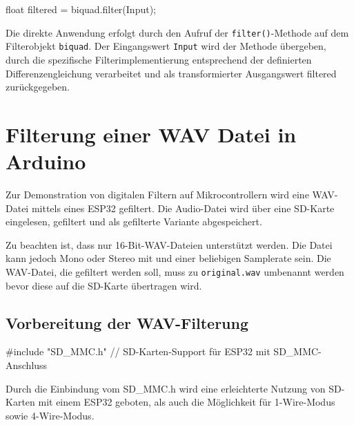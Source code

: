 \documentclass[
  ngerman,
  letterpaper,
  DIV=11]{scrreprt}
\newenvironment{Shaded}{\begin{snugshade}}{\end{snugshade}}
\newcommand{\CommentTok}[1]{\textcolor[rgb]{0.37,0.37,0.37}{#1}}
\newcommand{\DataTypeTok}[1]{\textcolor[rgb]{0.68,0.00,0.00}{#1}}
\newcommand{\ImportTok}[1]{\textcolor[rgb]{0.00,0.46,0.62}{#1}}
\newcommand{\NormalTok}[1]{\textcolor[rgb]{0.00,0.23,0.31}{#1}}
\newcommand{\OperatorTok}[1]{\textcolor[rgb]{0.37,0.37,0.37}{#1}}
\newcommand{\PreprocessorTok}[1]{\textcolor[rgb]{0.68,0.00,0.00}{#1}}
\begin{document}
\begin{Shaded}
\begin{Highlighting}[]
\DataTypeTok{float}\NormalTok{ filtered }\OperatorTok{=}\NormalTok{ biquad}\OperatorTok{.}\NormalTok{filter}\OperatorTok{(}\NormalTok{Input}\OperatorTok{);}
\end{Highlighting}
\end{Shaded}

Die direkte Anwendung erfolgt durch den Aufruf der
\texttt{filter()}-Methode auf dem Filterobjekt \texttt{biquad}. Der
Eingangswert \texttt{Input} wird der Methode übergeben, durch die
spezifische Filterimplementierung entsprechend der definierten
Differenzengleichung verarbeitet und als transformierter Ausgangswert
filtered zurückgegeben.

\chapter{Filterung einer WAV Datei in
Arduino}\label{filterung-einer-wav-datei-in-arduino}

Zur Demonstration von digitalen Filtern auf Mikrocontrollern wird eine
WAV-Datei mittels eines ESP32 gefiltert. Die Audio-Datei wird über eine
SD-Karte eingelesen, gefiltert und als gefilterte Variante
abgespeichert.

Zu beachten ist, dass nur 16-Bit-WAV-Dateien unterstützt werden. Die
Datei kann jedoch Mono oder Stereo mit und einer beliebigen Samplerate
sein. Die WAV-Datei, die gefiltert werden soll, muss zu
\texttt{original.wav} umbenannt werden bevor diese auf die SD-Karte
übertragen wird.

\section{Vorbereitung der
WAV-Filterung}\label{vorbereitung-der-wav-filterung}

\begin{Shaded}
\begin{Highlighting}[]
\PreprocessorTok{\#include }\ImportTok{"SD\_MMC.h"}\PreprocessorTok{ }\CommentTok{// SD{-}Karten{-}Support für ESP32 mit SD\_MMC{-}Anschluss}
\end{Highlighting}
\end{Shaded}

Durch die Einbindung vom SD\_MMC.h wird eine erleichterte Nutzung von
SD-Karten mit einem ESP32 geboten, als auch die Möglichkeit für
1-Wire-Modus sowie 4-Wire-Modus.
\end{document}
